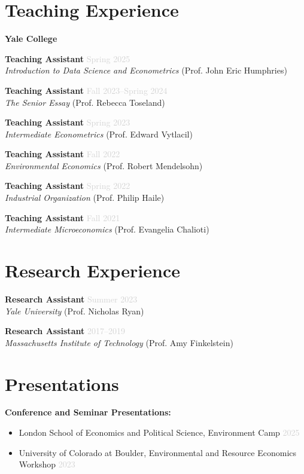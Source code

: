 \documentclass[11pt,letterpaper]{article}
\newcommand{\jobtitle}[1]{\textbf{\color{mediumgray}#1}}
\newcommand{\institution}[1]{\textit{#1}}
\newcommand{\daterange}[1]{\textcolor{lightgray}{#1}}
\begin{document}
\section*{Teaching Experience}

\textbf{Yale College}

\jobtitle{Teaching Assistant} \hfill \daterange{Spring 2025} \\
\institution{Introduction to Data Science and Econometrics} (Prof. John Eric Humphries)

\jobtitle{Teaching Assistant} \hfill \daterange{Fall 2023--Spring 2024} \\
\institution{The Senior Essay} (Prof. Rebecca Toseland)

\jobtitle{Teaching Assistant} \hfill \daterange{Spring 2023} \\
\institution{Intermediate Econometrics} (Prof. Edward Vytlacil)

\jobtitle{Teaching Assistant} \hfill \daterange{Fall 2022} \\
\institution{Environmental Economics} (Prof. Robert Mendelsohn)

\jobtitle{Teaching Assistant} \hfill \daterange{Spring 2022} \\
\institution{Industrial Organization} (Prof. Philip Haile)

\jobtitle{Teaching Assistant} \hfill \daterange{Fall 2021} \\
\institution{Intermediate Microeconomics} (Prof. Evangelia Chalioti)

\section*{Research Experience}

\jobtitle{Research Assistant} \hfill \daterange{Summer 2023} \\
\institution{Yale University} (Prof. Nicholas Ryan)

\jobtitle{Research Assistant} \hfill \daterange{2017--2019} \\
\institution{Massachusetts Institute of Technology} (Prof. Amy Finkelstein)

\section*{Presentations}

\textbf{Conference and Seminar Presentations:}
\begin{itemize}
\item London School of Economics and Political Science, Environment Camp \hfill \daterange{2025}
\item University of Colorado at Boulder, Environmental and Resource Economics Workshop \hfill \daterange{2023}
\end{itemize}
\end{document}
